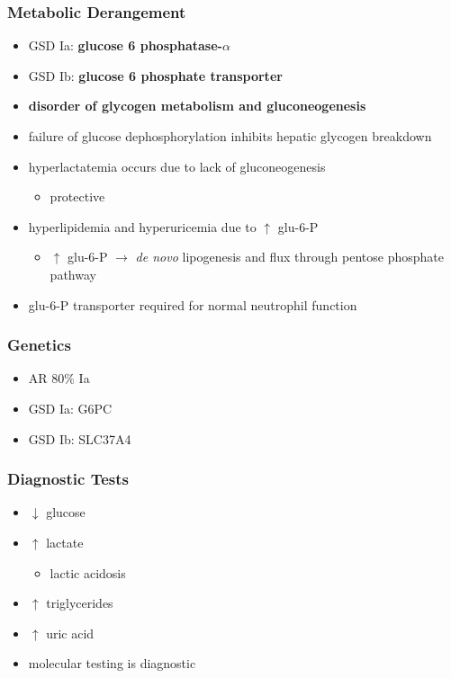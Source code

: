 \documentclass[12pt]{scrartcl}
\begin{document}
\subsubsection{Metabolic Derangement}
\label{sec:org8c3fabd}
\begin{itemize}
\item GSD Ia: \textbf{glucose 6 phosphatase-\(\alpha\)}
\item GSD Ib: \textbf{glucose 6 phosphate transporter}
\item \textbf{disorder of glycogen metabolism and gluconeogenesis}
\item failure of glucose dephosphorylation inhibits hepatic glycogen breakdown
\item hyperlactatemia occurs due to lack of gluconeogenesis
\begin{itemize}
\item protective
\end{itemize}
\item hyperlipidemia and hyperuricemia due to \(\uparrow\) glu-6-P
\begin{itemize}
\item \(\uparrow\) glu-6-P \(\to\) \emph{de novo} lipogenesis and flux through pentose phosphate pathway
\end{itemize}
\item glu-6-P transporter required for normal neutrophil function
\end{itemize}

\subsubsection{Genetics}
\label{sec:orgbe066df}
\begin{itemize}
\item AR 80\% Ia
\item GSD Ia: G6PC
\item GSD Ib: SLC37A4
\end{itemize}

\subsubsection{Diagnostic Tests}
\label{sec:org04244ff}
\begin{itemize}
\item \(\downarrow\) glucose
\item \(\uparrow\) lactate
\begin{itemize}
\item lactic acidosis
\end{itemize}
\item \(\uparrow\) triglycerides
\item \(\uparrow\) uric acid
\item molecular testing is diagnostic
\end{itemize}
\end{document}
